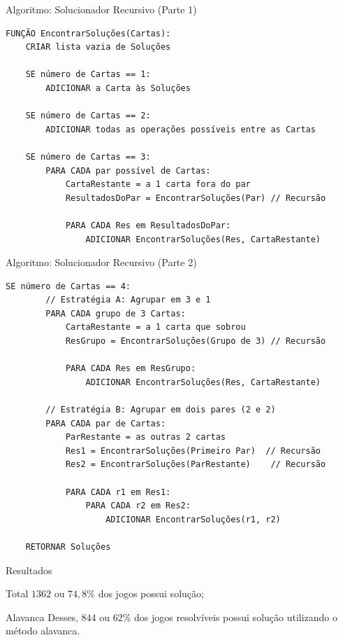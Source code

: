 \documentclass[aspectratio=169]{beamer}
\begin{document}
\begin{frame}[fragile]{Algoritmo: Solucionador Recursivo (Parte 1)}
	\begin{lstlisting}[mathescape=true]
FUNÇÃO EncontrarSoluções(Cartas):
    CRIAR lista vazia de Soluções

    SE número de Cartas == 1:
        ADICIONAR a Carta às Soluções
    
    SE número de Cartas == 2:
        ADICIONAR todas as operações possíveis entre as Cartas

    SE número de Cartas == 3:
        PARA CADA par possível de Cartas:
            CartaRestante = a 1 carta fora do par
            ResultadosDoPar = EncontrarSoluções(Par) // Recursão

            PARA CADA Res em ResultadosDoPar:
                ADICIONAR EncontrarSoluções(Res, CartaRestante)
\end{lstlisting}
\end{frame}


\begin{frame}[fragile]{Algoritmo: Solucionador Recursivo (Parte 2)}
	\begin{lstlisting}[mathescape=true]
    SE número de Cartas == 4:
        // Estratégia A: Agrupar em 3 e 1
        PARA CADA grupo de 3 Cartas:
            CartaRestante = a 1 carta que sobrou
            ResGrupo = EncontrarSoluções(Grupo de 3) // Recursão

            PARA CADA Res em ResGrupo:
                ADICIONAR EncontrarSoluções(Res, CartaRestante)

        // Estratégia B: Agrupar em dois pares (2 e 2)
        PARA CADA par de Cartas:
            ParRestante = as outras 2 cartas
            Res1 = EncontrarSoluções(Primeiro Par)  // Recursão
            Res2 = EncontrarSoluções(ParRestante)    // Recursão

            PARA CADA r1 em Res1:
                PARA CADA r2 em Res2:
                    ADICIONAR EncontrarSoluções(r1, r2)

    RETORNAR Soluções
\end{lstlisting}
\end{frame}

\begin{frame}{Resultados}
	\begin{block}{Total}
		$1362$ ou $74,8\%$ dos jogos possui solução;
	\end{block}

	\begin{block}{Alavanca}
		Desses, $844$ ou $62\%$ dos jogos resolvíveis possui solução utilizando o método alavanca.
	\end{block}
\end{frame}
\end{document}
